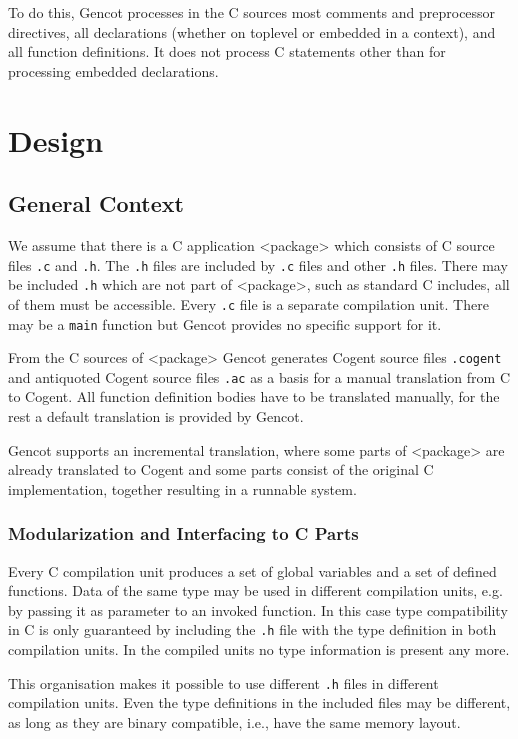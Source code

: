 \documentclass[a4paper]{report}
\newcommand{\code}[1]{\textnormal{\texttt{#1}}}
\begin{document}
To do this, Gencot processes in the C sources most comments and preprocessor directives, all declarations (whether
on toplevel or embedded in a context), and all function definitions. It does not process C statements other than
for processing embedded declarations.

\chapter{Design}

\section{General Context}

We assume that there is a C application <package> which consists of C source files \code{.c} and \code{.h}. The 
\code{.h} files are included by \code{.c} files and other \code{.h} files. There may be included \code{.h} which
are not part of <package>, such as standard C includes, all of them must be accessible. Every \code{.c} file
is a separate compilation unit. There may be a \code{main} function but Gencot provides no specific support for it.

From the C sources of <package> Gencot generates Cogent source files \code{.cogent} and antiquoted Cogent source
files \code{.ac} as a basis for a manual translation from C to Cogent. All function definition bodies have to be
translated manually, for the rest a default translation is provided by Gencot.

Gencot supports an incremental translation, where some parts of <package> are already translated to Cogent and
some parts consist of the original C implementation, together resulting in a runnable system.

\subsection{Modularization and Interfacing to C Parts}

Every C compilation unit produces
a set of global variables and a set of defined functions. Data of the same type may be used in
different compilation units, e.g. by passing it as parameter to an invoked function. In this case type compatibility in C is
only guaranteed by including the \code{.h} file with the type definition in both compilation units. In the compiled
units no type information is present any more. 

This organisation makes it possible to use different \code{.h} files in different compilation units. Even the type definitions
in the included files may be different, as long as they are binary compatible, i.e., have the same memory layout.
\end{document}
